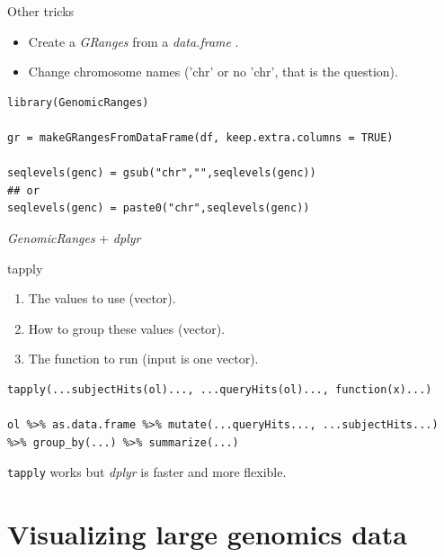 \documentclass[10pt]{beamer}
\newcommand{\df}{{\it data.frame} }
\begin{document}
\begin{frame}[fragile]{Other tricks}
  \begin{itemize}
  \item Create a {\it GRanges} from a \df.
  \item Change chromosome names ('chr' or no 'chr', that is the question).
  \end{itemize}
  \begin{block}{}
  \begin{lstlisting}
library(GenomicRanges)

gr = makeGRangesFromDataFrame(df, keep.extra.columns = TRUE)

seqlevels(genc) = gsub("chr","",seqlevels(genc))
## or
seqlevels(genc) = paste0("chr",seqlevels(genc))
  \end{lstlisting}
  \end{block}
\end{frame}

\begin{frame}[fragile]{{\it GenomicRanges} + {\it dplyr}}
  \begin{block}{{\sf tapply}}
    \begin{enumerate}
    \item The values to use (vector).
    \item How to group these values (vector).
    \item The function to run (input is one vector).
    \end{enumerate}
  \end{block}
  \begin{block}{}
  \begin{lstlisting}
tapply(...subjectHits(ol)..., ...queryHits(ol)..., function(x)...)

ol %>% as.data.frame %>% mutate(...queryHits..., ...subjectHits...) %>% group_by(...) %>% summarize(...)
  \end{lstlisting}
  \end{block}
  \begin{block}{}
    \verb!tapply! works but {\it dplyr} is faster and more flexible.
  \end{block}
\end{frame}

\section{Visualizing large genomics data}
\end{document}
